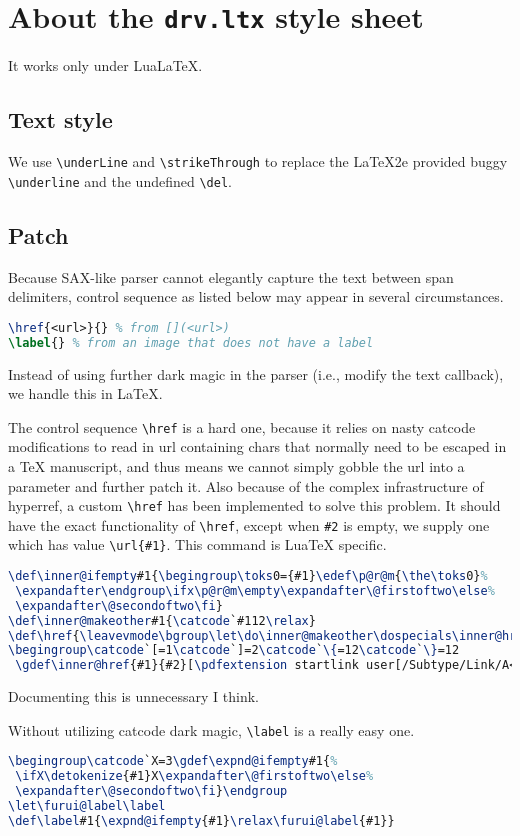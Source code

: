 \chapter{About the \texttt{drv.ltx} style sheet}
It works only under LuaLaTeX.\par
\section{Text style}
We use \verb!\underLine! and \verb!\strikeThrough! to replace the LaTeX2e provided buggy \verb!\underline! and the undefined \verb!\del!.\par
\section{Patch}
Because SAX-like parser cannot elegantly capture the text between span delimiters, control sequence as listed below may appear in several circumstances.\par
\begin{lstlisting}[language=TeX]
\href{<url>}{} % from [](<url>)
\label{} % from an image that does not have a label
\end{lstlisting}
Instead of using further dark magic in the parser (i.e., modify the text callback), we handle this in LaTeX.\par
The control sequence \verb!\href! is a hard one, because it relies on nasty catcode modifications to read in url containing chars that normally need to be escaped in a TeX manuscript, and thus means we cannot simply gobble the url into a parameter and further patch it.
Also because of the complex infrastructure of hyperref, a custom \verb!\href! has been implemented to solve this problem. It should have the exact functionality of \verb!\href!, except when \verb!#2! is empty, we supply one which has value \verb!\url{#1}!.
This command is LuaTeX specific.\par
\begin{lstlisting}[language=TeX]
\def\inner@ifempty#1{\begingroup\toks0={#1}\edef\p@r@m{\the\toks0}%
 \expandafter\endgroup\ifx\p@r@m\empty\expandafter\@firstoftwo\else%
 \expandafter\@secondoftwo\fi}
\def\inner@makeother#1{\catcode`#112\relax}
\def\href{\leavevmode\bgroup\let\do\inner@makeother\dospecials\inner@href}
\begingroup\catcode`[=1\catcode`]=2\catcode`\{=12\catcode`\}=12
 \gdef\inner@href{#1}{#2}[\pdfextension startlink user[/Subtype/Link/A<</Type/Action/S/URI/URI(#1)>>] \inner@ifempty[#2][\url[#1]][#2] \pdfextension endlink \egroup]\endgroup
\end{lstlisting}
Documenting this is unnecessary I think.\par
Without utilizing catcode dark magic, \verb!\label! is a really easy one.\par
\begin{lstlisting}[language=TeX]
\begingroup\catcode`X=3\gdef\expnd@ifempty#1{%
 \ifX\detokenize{#1}X\expandafter\@firstoftwo\else%
 \expandafter\@secondoftwo\fi}\endgroup
\let\furui@label\label
\def\label#1{\expnd@ifempty{#1}\relax\furui@label{#1}}
\end{lstlisting}
